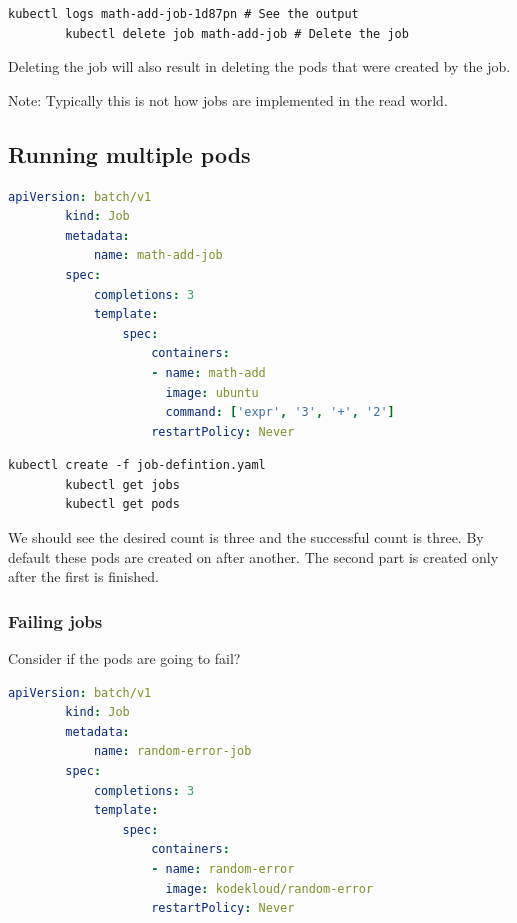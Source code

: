 \documentclass[11pt]{book}
\begin{document}
    \begin{lstlisting}[language=terminal, caption={Sumnmary of commands}]
        kubectl logs math-add-job-1d87pn # See the output
        kubectl delete job math-add-job # Delete the job
    \end{lstlisting}

    Deleting the job will also result in deleting the pods that were created by the job.

    Note: Typically this is not how jobs are implemented in the read world.

    \subsection{Running multiple pods}

    \begin{lstlisting}[language=yaml, caption={Job definition file}]
        apiVersion: batch/v1
        kind: Job
        metadata:
            name: math-add-job
        spec:
            completions: 3
            template:
                spec:
                    containers:
                    - name: math-add
                      image: ubuntu
                      command: ['expr', '3', '+', '2']
                    restartPolicy: Never
    \end{lstlisting}

    \begin{lstlisting}[language=terminal, caption={Sumnmary of commands}]
        kubectl create -f job-defintion.yaml
        kubectl get jobs
        kubectl get pods
    \end{lstlisting}

    We should see the desired count is three and the successful count is three.
    By default these pods are created on after another.
    The second part is created only after the first is finished.

    \subsubsection{Failing jobs}
    Consider if the pods are going to fail?
    \begin{lstlisting}[language=yaml, caption={Job definition file}]
        apiVersion: batch/v1
        kind: Job
        metadata:
            name: random-error-job
        spec:
            completions: 3
            template:
                spec:
                    containers:
                    - name: random-error
                      image: kodekloud/random-error
                    restartPolicy: Never
    \end{lstlisting}
\end{document}
